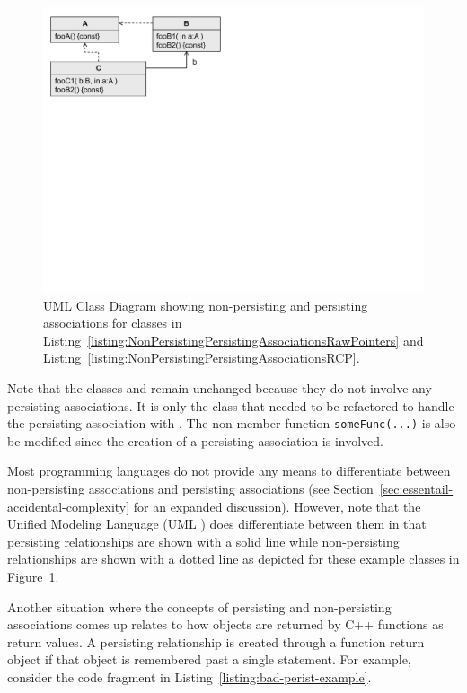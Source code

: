 \documentclass[pdf,ps2pdf,11pt]{SANDreport}
\begin{document}
{\bsinglespace
\begin{figure}
\begin{center}
\includegraphics*[angle=0,scale=0.65]{UML_A_B_C}
\end{center}
\caption[UML Class Diagram showing non-persisting and persisting associations]{
\label{fig:UML_A_B_C}
UML Class Diagram showing non-persisting and persisting associations
for classes in
Listing~\ref{listing:NonPersistingPersistingAssociationsRawPointers}
and Listing~\ref{listing:NonPersistingPersistingAssociationsRCP}.}
\end{figure}
\esinglespace}


Note that the classes {} and {} remain unchanged because
they do not involve any persisting associations.  It is only the class
{} that needed to be refactored to handle the persisting
association with {}.  The non-member function
{}\texttt{someFunc(...)} is also be modified since the creation of a
persisting association is involved.

Most programming languages do not provide any means to differentiate
between non-persisting associations and persisting associations (see
Section~\ref{sec:essentail-accidental-complexity} for an expanded
discussion).  However, note that the Unified Modeling Language (UML
{}\cite{UMLDistilledThirdEdition04}) does differentiate between them
in that persisting relationships are shown with a solid line while
non-persisting relationships are shown with a dotted line as depicted
for these example classes in Figure~\ref{fig:UML_A_B_C}.

Another situation where the concepts of persisting and non-persisting
associations comes up relates to how objects are returned by C++
functions as return values.  A persisting relationship is created
through a function return object if that object is remembered past a
single statement.  For example, consider the code fragment in
Listing~\ref{listing:bad-perist-example}.
\end{document}
